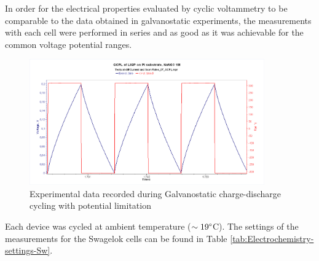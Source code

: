 In order for the electrical properties evaluated by cyclic voltammetry to be comparable to the data obtained in galvanostatic experiments, the measurements with each cell were performed in series and as good as it was achievable for the common voltage potential ranges. 
 
 \begin{figure}[H]
\centering
\includegraphics[width=0.9\textwidth]{Figures/ExperimentalSetup/Galvanostatic-charge_discharge_cell_1_I_V_time.jpg}
\medskip
\caption{Experimental data recorded during Galvanostatic charge-discharge cycling with potential limitation}
\label{fig:GCPL-typical}
\end{figure}

Each device was cycled at ambient temperature ($\sim19\degree$C). The settings of the measurements for the Swagelok cells can be found in Table \ref{tab:Electrochemistry-settings-Sw}.

